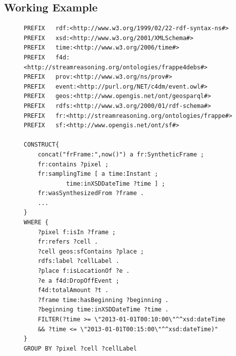 \subsection{Working Example} \label{sec:conc-fr-1-synth-ex}

\begin{figure}[t]
\begin{minipage}[t]{0.95\linewidth}
\begin{lstlisting}[label={lst:sparql-debs}, caption={Sparql query to create the \textsc{SytheticFrame}s containing the \textsc{Pixel}s with the profitability value.}, style=SPARQL]
PREFIX   rdf:<http://www.w3.org/1999/02/22-rdf-syntax-ns#>
PREFIX   xsd:<http://www.w3.org/2001/XMLSchema#>
PREFIX   time:<http://www.w3.org/2006/time#>
PREFIX   f4d:<http://streamreasoning.org/ontologies/frappe4debs#>
PREFIX   prov:<http://www.w3.org/ns/prov#> 
PREFIX   event:<http://purl.org/NET/c4dm/event.owl#>
PREFIX   geos:<http://www.opengis.net/ont/geosparql#>
PREFIX   rdfs:<http://www.w3.org/2000/01/rdf-schema#>
PREFIX   fr:<http://streamreasoning.org/ontologies/frappe#>
PREFIX   sf:<http://www.opengis.net/ont/sf#>

CONSTRUCT{
    concat("frFrame:",now()") a fr:SyntheticFrame ;
    fr:contains ?pixel ;
    fr:samplingTime [ a time:Instant ; 
    		time:inXSDDateTime ?time ] ;
    fr:wasSynthesizedFrom ?frame . 
    ...
}
WHERE {
	?pixel f:isIn ?frame ;
	fr:refers ?cell .
	?cell geos:sfContains ?place ;
	rdfs:label ?cellLabel .
	?place f:isLocationOf ?e .
	?e a f4d:DropOffEvent ;
	f4d:totalAmount ?t .
	?frame time:hasBeginning ?beginning .
	?beginning time:inXSDDateTime ?time .
	FILTER(?time >= \"2013-01-01T00:10:00\"^^xsd:dateTime
    && ?time <= \"2013-01-01T00:15:00\"^^xsd:dateTime)"
}
GROUP BY ?pixel ?cell ?cellLabel
\end{lstlisting}
\end{minipage}
\end{figure} 

